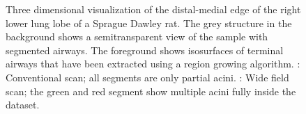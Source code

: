 \begin{figure}
{%
	}%
	\caption{Three dimensional visualization of the distal-medial edge of the right lower lung lobe of a Sprague Dawley rat. The grey structure in the background shows a semitransparent view of the sample with segmented airways. The foreground shows isosurfaces of terminal airways that have been extracted using a region growing algorithm. : Conventional scan; all segments are only partial acini. : Wide field scan; the green and red segment show multiple acini fully inside the dataset.}%
	\label{fig:FOV increase overview}%
\end{figure}

